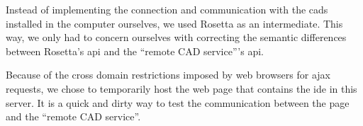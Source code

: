 Instead of implementing the connection and communication with the \glspl{cad} installed in the computer ourselves, we used Rosetta as an intermediate.
This way, we only had to concern ourselves with correcting the semantic differences between Rosetta's \gls{api} and the ``remote CAD service'''s \gls{api}.

Because of the cross domain restrictions imposed by web browsers for \gls{ajax} requests, we chose to temporarily host the web page that contains the \gls{ide} in this server.
It is a quick and dirty way to test the communication between the page and the ``remote CAD service''.




